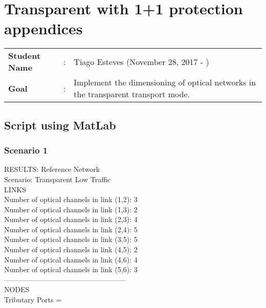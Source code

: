 \clearpage

\section{Transparent with 1+1 protection appendices}
\begin{tcolorbox}	
\begin{tabular}{p{2.75cm} p{0.2cm} p{10.5cm}} 	
\textbf{Student Name}  &:& Tiago Esteves    (November 28, 2017 - )\\
\textbf{Goal}          &:& Implement the dimensioning of optical networks in the transparent transport mode.
\end{tabular}
\end{tcolorbox}


\subsection{Script using MatLab}

\subsubsection{Scenario 1}

\qquad RESULTS: Reference Network \\

\quad Scenario: Transparent Low Traffic \\

LINKS \\

Number of optical channels in link (1,2): 3\\
\qquad Number of optical channels in link (1,3): 2\\
\qquad Number of optical channels in link (2,3): 4\\
\qquad Number of optical channels in link (2,4): 5\\
\qquad Number of optical channels in link (3,5): 5\\
\qquad Number of optical channels in link (4,5): 2\\
\qquad Number of optical channels in link (4,6): 4\\
\qquad Number of optical channels in link (5,6): 3\\

--------------------------------------------------- \\
NODES \\


Tributary  Ports = \\


